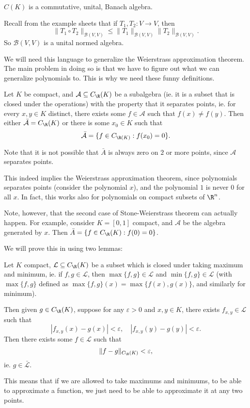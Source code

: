 \documentclass[a4paper]{article}
\begin{document}
\begin{eg}
  $C(K)$ is a commutative, unital, Banach algebra.
\end{eg}

\begin{eg}
  Recall from the example sheets that if $T_1, T_2: V\to V$, then
  \[
    \|T_1 \circ T_2\|_{\mathcal{B}(V, V)} \leq \|T_1\|_{\mathcal{B}(V, V)}\|T_2\|_{\mathcal{B}(V, V)}.
  \]
  So $\mathcal{B}(V, V)$ is a unital normed algebra.
\end{eg}

We will need this language to generalize the Weierstrass approximation theorem. The main problem in doing so is that we have to figure out what we can generalize polynomials to. This is why we need these funny definitions.

\begin{thm}
  Let $K$ be compact, and $\mathcal{A} \subseteq C_{\R}(K)$ be a subalgebra (ie. it is a subset that is closed under the operations) with the property that it separates points, ie. for every $x, y \in K$ distinct, there exists some $f \in \mathcal{A}$ such that $f(x) \not= f(y)$. Then either $\bar{\mathcal{A}} = C_\R(K)$ or there is some $x_0 \in K$ such that
  \[
    \bar{\mathcal{A}} = \{f \in C_{\R(K)}: f(x_0) = 0\}.
  \]
\end{thm}
Note that it is not possible that $\bar{A}$ is always zero on $2$ or more points, since $\mathcal{A}$ separates points.

This indeed implies the Weierstrass approximation theorem, since polynomials separates points (consider the polynomial $x$), and the polynomial $1$ is never $0$ for all $x$. In fact, this works also for polynomials on compact subsets of $\R^n$.

Note, however, that the second case of Stone-Weierstrass theorem can actually happen. For example, consider $K = [0, 1]$ compact, and $\mathcal{A}$ be the algebra generated by $x$. Then $\bar{A} = \{f \in C_\R(K): f(0) = 0\}$.

We will prove this in using two lemmas:
\begin{lemma}
  Let $K$ compact, $\mathcal{L} \subseteq C_\R(K)$ be a subset which is closed under taking maximum and minimum, ie. if $f, g \in \mathcal{L}$, then $\max\{f, g\} \in \mathcal{L}$ and $\min \{f, g\} \in \mathcal{L}$ (with $\max\{f, g\}$ defined as $\max\{f, g\}(x) = \max\{f(x), g(x)\}$, and similarly for minimum).

  Then given $g \in C_\R(K)$, suppose for any $\varepsilon > 0$ and $x, y \in K$, there exists $f_{x, y} \in \mathcal{L}$ such that
  \[
    |f_{x, y}(x) - g(x)| < \varepsilon,\quad |f_{x, y}(y) - g(y)| < \varepsilon.
  \]
  Then there exists some $f \in \mathcal{L}$ such that
  \[
    \|f - g\|_{C_\R(K)} < \varepsilon,
  \]
  ie. $g \in \bar{\mathcal{L}}$.
\end{lemma}
This means that if we are allowed to take maximums and minimums, to be able to approximate a function, we just need to be able to approximate it at any two points.
\end{document}
